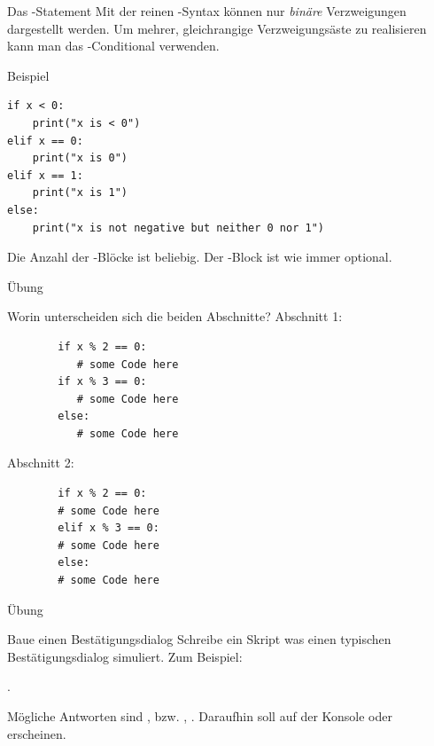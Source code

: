 \begin{fragile}

\begin{block}{Das -Statement}
	\vspace{2pt}
Mit der reinen -Syntax können nur \emph{binäre} Verzweigungen dargestellt werden. Um mehrer, gleichrangige Verzweigungsäste zu realisieren kann man das -Conditional verwenden. 
\end{block}
\pause
\begin{exampleblock}{Beispiel}
\begin{verbatim}
if x < 0: 
    print("x is < 0")
elif x == 0: 
    print("x is 0")
elif x == 1: 
    print("x is 1")
else: 
    print("x is not negative but neither 0 nor 1")         
\end{verbatim}
\end{exampleblock}
\pause
Die Anzahl der -Blöcke ist beliebig. Der -Block ist wie immer optional. 

\end{fragile}

\begin{fragile}{Übung}
	\begin{block}{Worin unterscheiden sich die beiden Abschnitte?}
		\vspace{5pt}
		Abschnitt 1: 
		\begin{verbatim}
		if x % 2 == 0: 
		   # some Code here
		if x % 3 == 0: 
		   # some Code here
		else: 
		   # some Code here  
		\end{verbatim}
		Abschnitt 2: 
		\begin{verbatim}
		if x % 2 == 0: 
		# some Code here
		elif x % 3 == 0: 
		# some Code here
		else: 
		# some Code here  
		\end{verbatim}
	\end{block}
\end{fragile}

\begin{frame}{Übung}
\begin{block}{Baue einen Bestätigungsdialog}
\vspace{2pt}
Schreibe ein Skript was einen typischen Bestätigungsdialog simuliert. 
Zum Beispiel: 

. 

Mögliche Antworten sind ,  bzw. , . 
Daraufhin soll auf der Konsole  oder  erscheinen. 
\end{block}
\end{frame}


